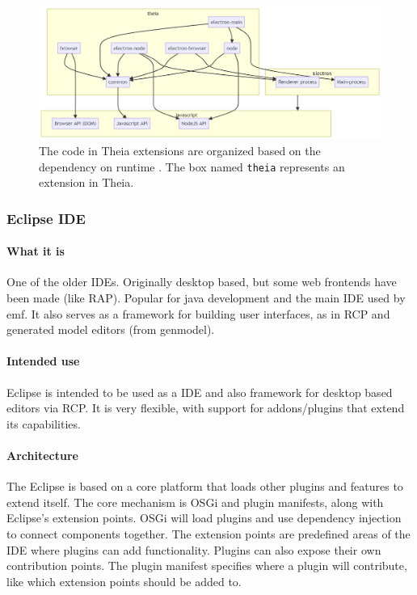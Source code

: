 \begin{figure}[htbp]  %
  \centering
  \includegraphics[width=\textwidth]{figures/theia-code-organization}
  \caption[Theia code organization]{The code in Theia extensions are organized based on the dependency on runtime . The box named \texttt{theia} represents an extension in Theia.~\cite{antonkosyakovCodeOrganization2019}}\label{fig:theia-organization}
\end{figure}


\subsubsection{Eclipse IDE}\label{sec:eclipse-ide}

\paragraph*{What it is}
One of the older \glspl{IDE}. 
Originally desktop based, but some web frontends have been made (like \gls{RAP}).
Popular for java development and the main \gls{IDE} used by \gls{emf}.
It also serves as a framework for building user interfaces, as in \gls{RCP} and generated model editors (from genmodel).

\paragraph*{Intended use}
\Gls{Eclipse} is intended to be used as a \gls{IDE} and also framework for desktop based editors via \gls{RCP}.
It is very flexible, with support for addons/plugins that extend its capabilities.

\paragraph*{Architecture}
The \gls{Eclipse} is based on a core platform that loads other plugins and features to extend itself.
The core mechanism is OSGi and plugin manifests, along with Eclipse's extension points.
OSGi will load plugins and use dependency injection to connect components together.
The extension points are predefined areas of the \acrshort{IDE} where plugins can add functionality.
Plugins can also expose their own contribution points.
The plugin manifest specifies where a plugin will contribute, like which extension points should be added to.


